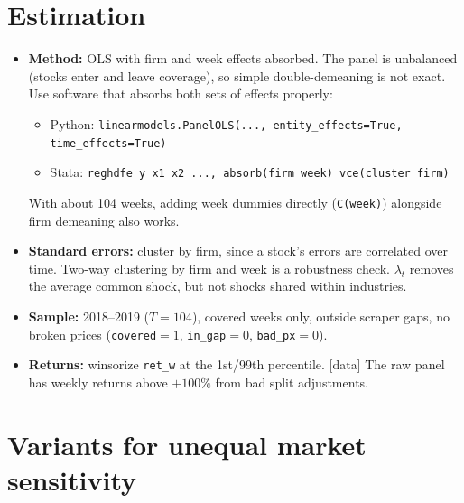 \documentclass[11pt]{article}
\newcommand{\data}{\textcolor{NavyBlue}{\textsf{[data]}}}
\newcommand{\var}[1]{\texttt{#1}}
\begin{document}
\section{Estimation}

\begin{itemize}
  \item \textbf{Method:} OLS with firm and week effects absorbed. The panel is unbalanced (stocks enter and leave coverage), so simple double-demeaning is not exact. Use software that absorbs both sets of effects properly:
  \begin{itemize}
    \item Python: \var{linearmodels.PanelOLS(..., entity\_effects=True, time\_effects=True)}
    \item Stata: \var{reghdfe y x1 x2 ..., absorb(firm week) vce(cluster firm)}
  \end{itemize}
  With about 104 weeks, adding week dummies directly (\var{C(week)}) alongside firm demeaning also works.
  \item \textbf{Standard errors:} cluster by firm, since a stock's errors are correlated over time. Two-way clustering by firm and week is a robustness check. $\lambda_t$ removes the average common shock, but not shocks shared within industries.
  \item \textbf{Sample:} 2018--2019 ($T=104$), covered weeks only, outside scraper gaps, no broken prices (\var{covered}$=1$, \var{in\_gap}$=0$, \var{bad\_px}$=0$).
  \item \textbf{Returns:} winsorize \var{ret\_w} at the 1st/99th percentile. \data{} The raw panel has weekly returns above $+100\%$ from bad split adjustments.
\end{itemize}

\section{Variants for unequal market sensitivity}\label{sec:variants}
\end{document}
